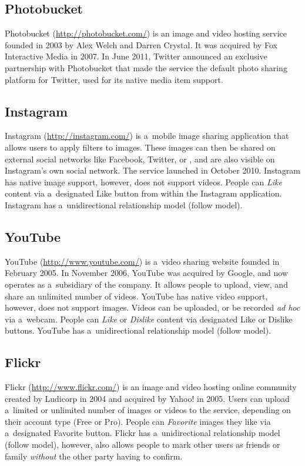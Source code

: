 \subsection{Photobucket}

Photobucket (\url{http://photobucket.com/})
is an image and video hosting service
founded in 2003 by Alex Welch and Darren Crystal.
It was acquired by Fox Interactive Media in 2007.
In June 2011, Twitter announced an exclusive partnership
with Photobucket that made the service
the default photo sharing platform for Twitter,
used for its native media item support.

\subsection{Instagram}

Instagram (\url{http://instagram.com/})
is a~mobile image sharing application
that allows users to apply filters to images.
These images can then be shared on external social networks
like Facebook, Twitter, or \googleplus,
and are also visible on Instagram's own social network.
The service launched in October 2010.
Instagram has native image support, however,
does not support videos.
People can \emph{Like} content via a~designated Like button
from within the Instagram application.
Instagram has a~unidirectional relationship model (follow model).

\subsection{YouTube}

YouTube (\url{http://www.youtube.com/})
is a~video sharing website founded in February 2005.
In November 2006, YouTube was acquired by Google,
and now operates as a~subsidiary of the company.
It allows people to upload, view,
and share an unlimited number of videos.
YouTube has native video support, however, does not support images.
Videos can be uploaded, or be recorded \emph{ad hoc} via a~webcam.
People can \emph{Like} or \emph{Dislike} content
via designated Like or Dislike buttons.
YouTube has a~unidirectional relationship model (follow model).

\subsection{Flickr}

Flickr (\url{http://www.flickr.com/})
is an image and video hosting online community
created by Ludicorp in 2004 and acquired by Yahoo! in 2005.
Users can upload a~limited or unlimited number of images or videos
to the service, depending on their account type (Free or Pro).
People can \emph{Favorite} images they like
via a~designated Favorite button.
Flickr has a~unidirectional relationship model (follow model),
however, also allows people to mark other users as friends
or family \emph{without} the other party having to confirm.

